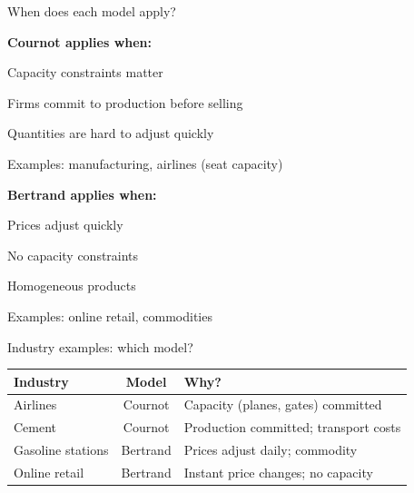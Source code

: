 \documentclass[notes,11pt, aspectratio=169]{beamer}
\newenvironment{wideitemize}{\itemize\addtolength{\itemsep}{10pt}}{\enditemize}
\begin{document}
\begin{frame}{When does each model apply?}
	\begin{wideitemize}
		\item \textbf{Cournot applies when:}
		\begin{wideitemize}
			\vspace{5pt}
			\item Capacity constraints matter
			\item Firms commit to production before selling
			\item Quantities are hard to adjust quickly
		\end{wideitemize}
		\item Examples: manufacturing, airlines (seat capacity)
		\item \textbf{Bertrand applies when:}
		\begin{wideitemize}
			\vspace{5pt}
			\item Prices adjust quickly
			\item No capacity constraints
			\item Homogeneous products
		\end{wideitemize}
		\item Examples: online retail, commodities
	\end{wideitemize}
\end{frame}

\begin{frame}{Industry examples: which model?}
	\begin{center}
	\begin{tabular}{|l|c|l|}
		\hline
		\textbf{Industry} & \textbf{Model} & \textbf{Why?} \\
		\hline
		Airlines & \pause Cournot & Capacity (planes, gates) committed \\
		\hline \pause
		Cement & \pause Cournot & Production committed; transport costs \\
		\hline \pause
		Gasoline stations & \pause Bertrand & Prices adjust daily; commodity \\
		\hline \pause
		Online retail & \pause Bertrand & Instant price changes; no capacity \\
		\hline
	\end{tabular}
	\end{center}
\end{frame}

\end{document}

